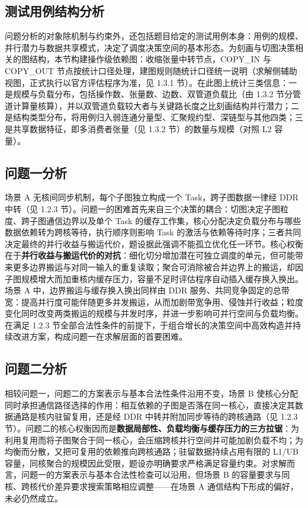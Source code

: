 \subsection{测试用例结构分析}\label{sec:case-analysis}
问题分析的对象除机制与约束外，还包括题目给定的测试用例本身：用例的规模、并行潜力与数据共享模式，决定了调度决策空间的基本形态。为刻画与切图决策相关的图结构，本节构建操作级依赖图：收缩张量中转节点，COPY\_IN 与 COPY\_OUT 节点按统计口径处理，建图规则随统计口径统一说明（求解侧辅助视图，正式执行以官方评估程序为准，见 1.3.1 节）。在此图上统计三类信息：一是规模与负载分布，包括操作数、张量数、边数、双管道负载比（由 1.3.2 节分管道计算量核算），并以双管道负载较大者与关键路长度之比刻画结构并行潜力；二是结构类型分布，将用例归入弱连通分量型、汇聚规约型、深链型与其他四类；三是共享数据特征，即多消费者张量（见 1.3.2 节）的数量与规模（对照 L2 容量）。

\subsection{问题一分析}
场景 A 无核间同步机制，每个子图独立构成一个 Task，跨子图数据一律经 DDR 中转（见 1.2.3 节）。问题一的困难首先来自三个决策的耦合：切图决定子图粒度、跨子图通信边界以及单个 Task 的缓存工作集，核心分配决定负载分布与哪些数据依赖转为跨核等待，执行顺序则影响 Task 的激活与依赖等待时序；三者共同决定最终的并行收益与搬运代价，题设据此强调不能孤立优化任一环节。核心权衡在于\textbf{并行收益与搬运代价的对抗}：细化切分增加潜在可独立调度的单元，但可能带来更多边界搬运与对同一输入的重复读取；聚合可消除被合并边界上的搬运，却因子图规模增大而加重核内缓存压力，容量不足时评估程序自动插入缓存换入换出。场景 A 中，边界搬运与缓存换入换出同样由 DDR 服务、共同竞争固定的总带宽：提高并行度可能伴随更多并发搬运，从而加剧带宽争用、侵蚀并行收益；粒度变化同时改变两类搬运的规模与并发时序，并进一步影响可并行空间与负载均衡。在满足 1.2.3 节全部合法性条件的前提下，于组合增长的决策空间中高效构造并持续改进方案，构成问题一在求解层面的首要困难。

\subsection{问题二分析}
相较问题一，问题二的方案表示与基本合法性条件沿用不变，场景 B 使核心分配同时承担通信路径选择的作用：相互依赖的子图是否落在同一核心，直接决定其数据通路是核内驻留复用，还是经 DDR 中转并附加同步等待的跨核通路（见 1.2.3 节）。问题二的核心权衡因而是\textbf{数据局部性、负载均衡与缓存压力的三方拉锯}：为利用复用而将子图聚合于同一核心，会压缩跨核并行空间并可能加剧负载不均；为均衡而分散，又把可复用的依赖推向跨核通路；驻留数据持续占用有限的 L1/UB 容量，同核聚合的规模因此受限，题设亦明确要求严格满足容量约束。对求解而言，问题一的方案表示与基本合法性检查可以沿用，但场景 B 的容量要求与同核、跨核代价差异要求搜索策略相应调整——在场景 A 通信结构下形成的偏好，未必仍然成立。

